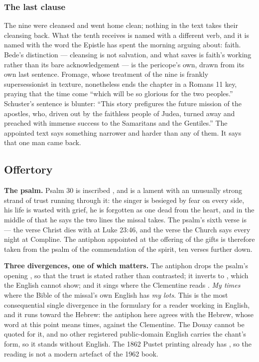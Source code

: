 \subsubsection*{The last clause}

 The nine were cleansed and
went home clean; nothing in the text takes their cleansing back. What the tenth
receives is named with a different verb, and it is named with the word the
Epistle has spent the morning arguing about: faith. Bede's distinction ---
cleansing is not salvation, and what saves is faith's working rather than its
bare acknowledgement --- is the pericope's own, drawn from its own last
sentence. Fromage, whose treatment of the nine is frankly supersessionist in
texture, nonetheless ends the chapter in a
Romans 11 key, praying that the time come ``which will be so glorious for the
two peoples.'' Schuster's sentence is blunter: ``This story prefigures the future mission of the apostles, who, driven
out by the faithless people of Judea, turned away and preached with immense
success to the Samaritans and the Gentiles.'' The appointed text says
something narrower and harder than any of them. It says that one man came
back.

\elementguard
\subsection*{Offertory }


\textbf{The psalm.} Psalm 30 is inscribed , and is a lament with an unusually strong strand of trust running
through it: the singer is besieged by fear on every side, his life is wasted
with grief, he is forgotten as one dead from the heart, and in the middle of
that he says the two lines the missal takes. The psalm's sixth verse is
 --- the verse Christ dies with at
Luke 23:46, and the verse the Church says every night at Compline. The
antiphon appointed at the offering of the gifts is therefore taken from the
psalm of the commendation of the spirit, ten verses further down.

\textbf{Three divergences, one of which matters.} The antiphon drops the
psalm's opening , so that the trust is stated rather than
contrasted; it inverts  to ,
which the English cannot show; and it sings  where the Clementine reads . \textit{My times} where the
Bible of the missal's own English has \textit{my lots}. This is the most
consequential single divergence in the formulary for a reader working in
English, and it runs toward the Hebrew: the antiphon here agrees with the
Hebrew, whose word at this point means times, against the Clementine. The
Douay cannot be quoted for it, and no other registered public-domain English
carries the chant's form, so it stands without English. The 1862 Pustet
printing already has , so the reading is not a modern
artefact of the 1962 book.

